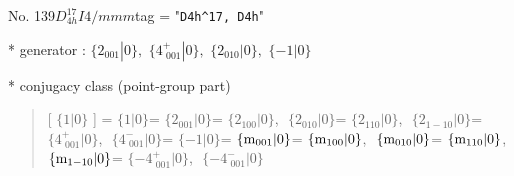 \documentclass[fleqn,10pt,landscape]{jsarticle}
\begin{document}
\newpage

No. 139\quad$D_{4h}^{17}$\quad$I4/mmm$\quad[ tetragonal ]
tag = "{\tt D4h^17, D4h}"

* generator : $\{2{}_{001}|0\},\,\,\{4^{+}_{\,\,001}|0\},\,\,\{2{}_{010}|0\},\,\,\{-1|0\}$

* conjugacy class (point-group part)
\begin{quote}
[ $\{1|0\}$ ] = \quad $\{1|0\}$\newline[ $\{2{}_{001}|0\}$ ] = \quad $\{2{}_{001}|0\}$\newline[ $\{2{}_{100}|0\}$ ] = \quad $\{2{}_{100}|0\}$,\,\, $\{2{}_{010}|0\}$\newline[ $\{2{}_{110}|0\}$ ] = \quad $\{2{}_{110}|0\}$,\,\, $\{2{}_{1-10}|0\}$\newline[ $\{4^{+}_{\,\,001}|0\}$ ] = \quad $\{4^{+}_{\,\,001}|0\}$,\,\, $\{4^{-}_{\,\,001}|0\}$\newline[ $\{-1|0\}$ ] = \quad $\{-1|0\}$\newline[ $\{{\rm m}_{001}|0\}$ ] = \quad $\{{\rm m}_{001}|0\}$\newline[ $\{{\rm m}_{100}|0\}$ ] = \quad $\{{\rm m}_{100}|0\}$,\,\, $\{{\rm m}_{010}|0\}$\newline[ $\{{\rm m}_{110}|0\}$ ] = \quad $\{{\rm m}_{110}|0\}$,\,\, $\{{\rm m}_{1-10}|0\}$\newline[ $\{-4^{+}_{\,\,001}|0\}$ ] = \quad $\{-4^{+}_{\,\,001}|0\}$,\,\, $\{-4^{-}_{\,\,001}|0\}$\newline
\end{quote}
\end{document}
